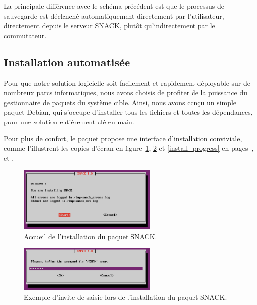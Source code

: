 La principale différence avec le schéma précédent est que le processus de sauvegarde est déclenché automatiquement directement par l'utilisateur, directement depuis le serveur SNACK, plutôt qu'indirectement par le commutateur.

\subsection{Installation automatisée}

Pour que notre solution logicielle soit facilement et rapidement déployable sur de nombreux parcs informatiques, nous avons choisis de profiter de la puissance du gestionnaire de paquets du système cible. Ainsi, nous avons conçu un simple paquet Debian, qui s'occupe d'installer tous les fichiers et toutes les dépendances, pour une solution entièrement clé en main.

Pour plus de confort, le paquet propose une interface d'installation conviviale, comme l'illustrent les copies d'écran en figure~\ref{install_start}, \ref{install_prompt} et \ref{install_progress} en pages~\pageref{install_start}, \pageref{install_prompt} et \pageref{install_progress}.

\begin{figure}[!h]
	\begin{center}
	    \includegraphics[width=0.6\textwidth]{img/install_start.png}
	\end{center}
	\caption{Accueil de l'installation du paquet SNACK.}
	\label{install_start}
\end{figure}

\begin{figure}[!h]
	\begin{center}
	    \includegraphics[width=0.6\textwidth]{img/install_prompt.png}
	\end{center}
	\caption{Exemple d'invite de saisie lors de l'installation du paquet SNACK.}
	\label{install_prompt}
\end{figure}

